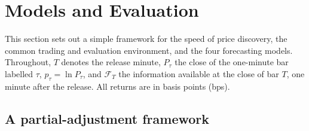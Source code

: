 \section{Models and Evaluation}\label{sec:exploit}

This section sets out a simple framework for the speed of price discovery, the common trading
and evaluation environment, and the four forecasting models. Throughout, $T$ denotes the release
minute, $P_\tau$ the close of the one-minute bar labelled $\tau$, $p_\tau=\ln P_\tau$, and
$\mathcal{F}_{T}$ the information available at the close of bar $T$, one minute after the
release. All returns are in basis points (bps).

\subsection{A partial-adjustment framework}\label{sec:framework}


